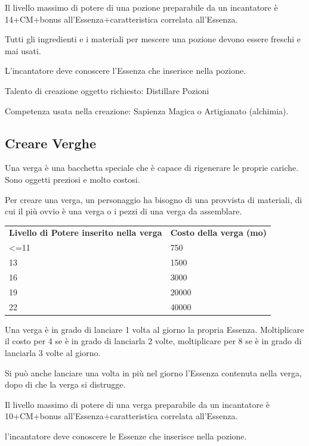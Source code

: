 \documentclass[a4paper,11pt,twoside,openany]{book}
\begin{document}
Il livello massimo di potere di una pozione preparabile da un incantatore è 14+CM+bonus all'Essenza+caratteristica correlata all'Essenza.

Tutti gli ingredienti e i materiali per mescere una pozione devono essere freschi e mai usati.

L'incantatore deve conoscere l'Essenza che inserisce nella pozione.

Talento di creazione oggetto richiesto: Distillare Pozioni

Competenza usata nella creazione: Sapienza Magica o Artigianato (alchimia).

\subsection{Creare Verghe}

Una verga è una bacchetta speciale che è capace di rigenerare le proprie cariche. Sono oggetti preziosi e molto costosi.

Per creare una verga, un personaggio ha bisogno di una provvista di materiali, di cui il più ovvio è una verga o i pezzi di una verga da assemblare.

\medskip

\begin{tabular}{ll}
	\toprule
	\textbf{Livello di Potere inserito nella verga} & \textbf{Costo della verga (mo)}\\
	\textless=11    & 750\\
	13              & 1500\\
	16              & 3000\\
	19              & 20000\\
	22              & 40000\\
\end{tabular}

\bigskip

Una verga è in grado di lanciare 1 volta al giorno la propria Essenza. Moltiplicare il costo per 4 se è in grado di lanciarla 2 volte, moltiplicare per 8 se è in grado di lanciarla 3 volte al giorno.

Si può anche lanciare una volta in più nel giorno l'Essenza contenuta nella verga, dopo di che la verga si distrugge.

Il livello massimo di potere di una verga preparabile da un incantatore è 10+CM+bonus all'Essenza+caratteristica correlata all'Essenza.

l'incantatore deve conoscere le Essenze che inserisce nella pozione.
\end{document}
